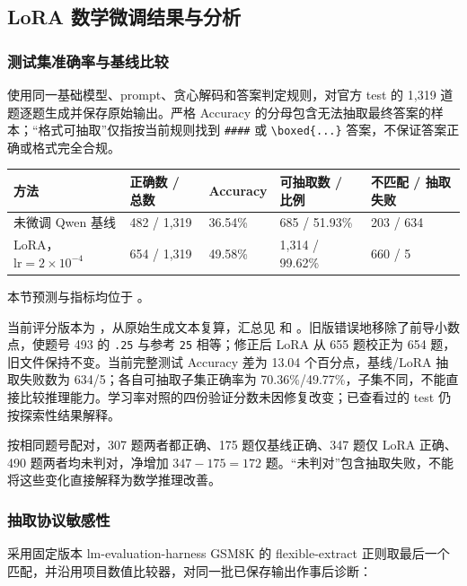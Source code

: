 \documentclass[UTF8,a4paper,12pt,fontset=none]{ctexart}
\begin{document}
\subsection{LoRA 数学微调结果与分析}

\subsubsection{测试集准确率与基线比较}
使用同一基础模型、prompt、贪心解码和答案判定规则，对官方 test 的 1,319 道题逐题生成并保存原始输出。严格 Accuracy 的分母包含无法抽取最终答案的样本；“格式可抽取”仅指按当前规则找到 \texttt{\#\#\#\#} 或 \texttt{\textbackslash boxed\{...\}} 答案，不保证答案正确或格式完全合规。

\noindent\begin{tabularx}{\textwidth}{>{\raggedright\arraybackslash}p{}YYYY}
\toprule
方法 & 正确数 / 总数 & Accuracy & 可抽取数 / 比例 & 不匹配 / 抽取失败 \\
\midrule
未微调 Qwen 基线 & 482 / 1,319 & 36.54\% & 685 / 51.93\% & 203 / 634 \\
LoRA，$\mathrm{lr}=2\times10^{-4}$ & 654 / 1,319 & 49.58\% & 1,314 / 99.62\% & 660 / 5 \\
\bottomrule
\end{tabularx}

本节预测与指标均位于 。

当前评分版本为 ，从原始生成文本复算，汇总见  和 。旧版错误地移除了前导小数点，使题号 493 的 \texttt{.25} 与参考 \texttt{25} 相等；修正后 LoRA 从 655 题校正为 654 题，旧文件保持不变。当前完整测试 Accuracy 差为 13.04 个百分点，基线/LoRA 抽取失败数为 634/5；各自可抽取子集正确率为 70.36\%/49.77\%，子集不同，不能直接比较推理能力。学习率对照的四份验证分数未因修复改变；已查看过的 test 仍按探索性结果解释。

按相同题号配对，307 题两者都正确、175 题仅基线正确、347 题仅 LoRA 正确、490 题两者均未判对，净增加 $347-175=172$ 题。“未判对”包含抽取失败，不能将这些变化直接解释为数学推理改善。

\subsubsection{抽取协议敏感性}
采用固定版本 lm-evaluation-harness GSM8K 的 flexible-extract 正则取最后一个匹配，并沿用项目数值比较器，对同一批已保存输出作事后诊断\cite{gsm8k_eval}：
\end{document}
